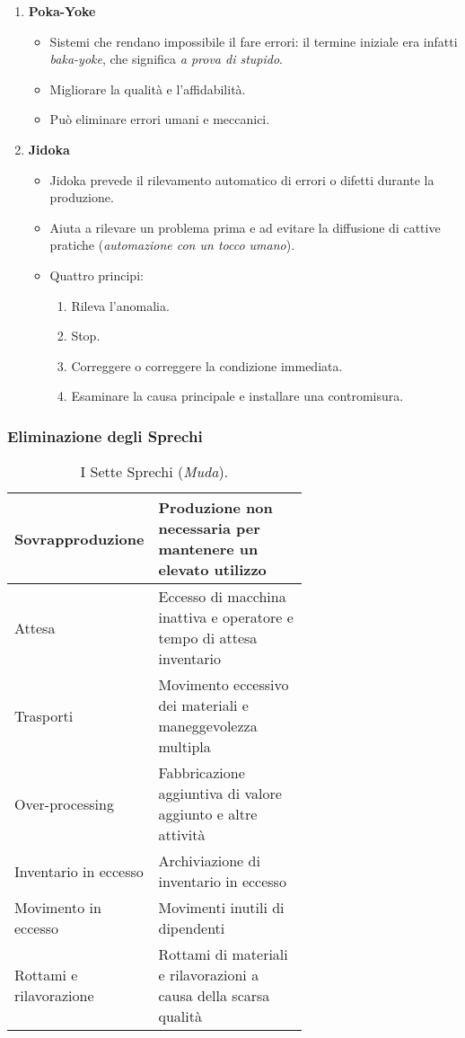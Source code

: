 \documentclass[a4paper,portrait,12pt]{article}
\theoremstyle{definition}
\begin{document}
\begin{enumerate}
\item \textbf{Poka-Yoke}
	\begin{itemize}
	\item Sistemi che rendano impossibile il fare errori: il termine iniziale era infatti \emph{baka-yoke}, che significa \emph{a prova di stupido}.
	\item Migliorare la qualità e l'affidabilità.
	\item Può eliminare errori umani e meccanici.
	\end{itemize}

\item \textbf{Jidoka}
	\begin{itemize}
	\item Jidoka prevede il rilevamento automatico di errori o difetti durante la produzione.
	\item Aiuta a rilevare un problema prima e ad evitare la diffusione di cattive pratiche (\emph{automazione con un tocco umano}).
	\item Quattro principi:
	\begin{enumerate}
	\item Rileva l'anomalia.
	\item Stop.
	\item Correggere o correggere la condizione immediata.
	\item Esaminare la causa principale e installare una contromisura.
	\end{enumerate}
	\end{itemize}
\end{enumerate}

\subsubsection{Eliminazione degli Sprechi}

\begin{table}[H]
\centering
\begin{tabular}{l|p{0.65\linewidth}}
Sovrapproduzione & Produzione non necessaria per mantenere un elevato utilizzo\\
\hline
Attesa & Eccesso di macchina inattiva e operatore e tempo di attesa inventario\\
\hline
Trasporti & Movimento eccessivo dei materiali e maneggevolezza multipla\\
\hline
Over-processing & Fabbricazione aggiuntiva di valore aggiunto e altre attività\\
\hline
Inventario in eccesso & Archiviazione di inventario in eccesso\\
\hline
Movimento in eccesso & Movimenti inutili di dipendenti\\
\hline
Rottami e rilavorazione & Rottami di materiali e rilavorazioni a causa della scarsa qualità
\end{tabular}
\caption{I Sette Sprechi (\emph{Muda}).}
\end{table}
\end{document}
